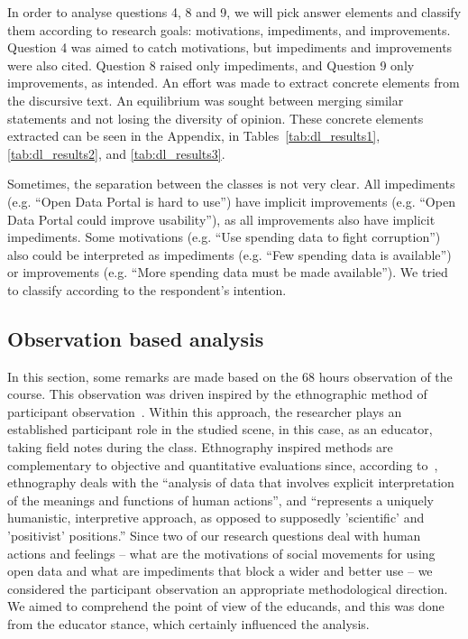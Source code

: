 In order to analyse questions 4, 8 and 9, we will pick answer elements and classify them according to research 
goals: motivations, impediments, and improvements. Question 4 was aimed to catch motivations, but impediments and improvements were also cited. Question 8 raised only impediments, and Question 9 only improvements, as intended.
An effort was made to extract concrete elements from the discursive text. An equilibrium was sought between merging similar statements and not losing the diversity of opinion. These concrete elements extracted can be seen in the Appendix, in Tables~\ref{tab:dl_results1}, \ref{tab:dl_results2}, and \ref{tab:dl_results3}.

Sometimes, the separation between the classes is not very clear. All impediments (e.g. “Open Data Portal is hard to use”) have implicit improvements (e.g. “Open Data Portal could improve usability”), as all improvements also have implicit impediments. Some motivations (e.g. “Use spending data to fight corruption”) also could be interpreted as impediments (e.g. “Few spending data is available”) or improvements (e.g. “More spending data must be made available”). We tried to classify according to the respondent's intention.

\subsection{Observation based analysis}

In this section, some remarks are made based on the 68 hours observation of the course. This observation was driven inspired by the ethnographic method of participant observation~\cite{Atkinson1994}. Within this approach, the researcher plays an established participant role in the studied scene, in this case, as an educator, taking field notes during the class. Ethnography inspired methods are complementary to objective and quantitative evaluations since, according to~, ethnography deals with the “analysis of data that involves explicit interpretation of the meanings and functions of human actions”, and “represents a uniquely humanistic, interpretive approach, as opposed to supposedly 'scientific' and 'positivist' positions.” Since two of our research questions deal with human actions and feelings – what are the motivations of social movements for using open data and what are impediments that block a wider and better use – we considered the participant observation an appropriate methodological direction. We aimed to comprehend the point of view of the educands, and this was done from the educator stance, which certainly influenced the analysis.


